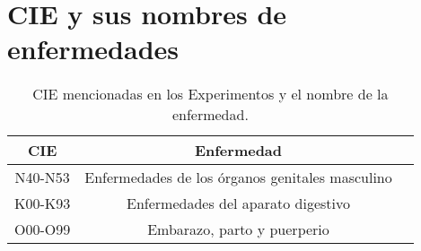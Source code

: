 \chapter{CIE y sus nombres de enfermedades}

\begin{table}[H]
	{\centering
		\caption{CIE mencionadas en los Experimentos y el nombre de la enfermedad.}
		\begin{tabular}{|c|c|c|}
			\hline 
			CIE & Enfermedad\\
			\hline
			N40-N53 & Enfermedades de los órganos genitales masculino\\
			\hline
			K00-K93 & Enfermedades del aparato digestivo\\
			\hline
			O00-O99 & Embarazo, parto y puerperio\\
			\hline
		\end{tabular}
		
	\label{tab:CIE y sus nombres de enfermedades}
	}
\end{table}







